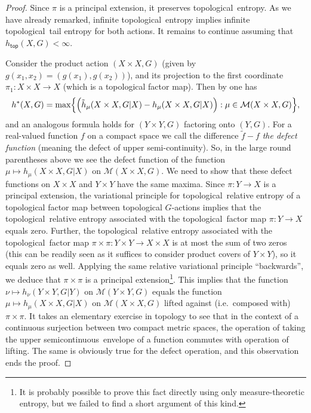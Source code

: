 \documentclass[12pt]{amsart}
\theoremstyle{definition}
\numberwithin{equation}{section}
\def \M {\mathcal M}
\def \htop {h_{\mathsf{top}}}
\def \tl {topological}
\def \htop{h_{\mathsf{top}}}
\def \usc {upper semicontinuous}
\def \M {\mathcal M}
\def \htop {h_{\mathsf{top}}}
\def \tl {topological}
\def \htop{h_{\mathsf{top}}}
\def \usc {upper semicontinuous}
\begin{document}
\begin{proof}
Since $\pi$ is a principal extension, it preserves \tl\ entropy. As we have already remarked,
infinite \tl\ entropy implies infinite \tl\ tail entropy for both actions. It remains to continue assuming that $\htop(X,G)<\infty$. 

Consider the product action $(X\times X, G)$ (given by $g(x_1,x_2)=(g(x_1),g(x_2))$), and its projection to the first coordinate $\pi_1: X\times X\rightarrow X$ (which is a topological factor map). Then by \cite[Theorem 3.1]{ZhouZhangChen} one has
\begin{equation} \label{tce-X}
h^*(X, G)= \max\Bigl\{\Bigr(\tilde h_\mu(X\times X,G|X)-h_\mu(X\times X,G|X)\Bigr): \mu\in\M(X\times X,G)\Bigr\},
\end{equation}
and an analogous formula holds for $(Y\times Y,G)$ factoring onto $(Y,G)$. For a real-valued function $f$ on a compact space we call the difference $\tilde f - f$ \emph{the defect function} (meaning the defect of upper semi-continuity). So, in the large round parentheses above we see the defect function of the function $\mu\mapsto h_\mu(X\times X,G|X)$ on $\M(X\times X,G)$. We need to show that these defect functions on $X\times X$ and $Y\times Y$ have the same maxima. Since $\pi:Y\to X$ is a principal extension, the variational principle for \tl\ relative entropy of a topological factor map between topological $G$-actions implies that the \tl\ relative entropy associated with the \tl\ factor map $\pi:Y\to X$ equals zero. Further, the \tl\ relative entropy associated with the \tl\ factor map $\pi\times\pi:Y\times Y\to X\times X$ is at most the sum of two zeros (this can be readily seen as it suffices to consider product covers of $Y\times Y$), so it equals zero as well. Applying the same relative variational principle ``backwards'', we deduce that $\pi\times\pi$ is a principal extension\footnote{It is probably possible to prove this fact directly using only measure-theoretic entropy, but we failed to find a short argument of this kind.}. This implies that the function $\nu\mapsto h_\nu(Y\times Y,G|Y)$ on $\M(Y\times Y,G)$ equals the function $\mu\mapsto h_\mu(X\times X,G|X)$ on $\M(X\times X,G)$ lifted against (i.e.\ composed with) $\pi\times\pi$. It takes an elementary exercise in topology to see that in the context of a continuous surjection between two compact metric spaces, the operation of taking the \usc\ envelope of a function commutes with operation of lifting. The same is obviously true for the defect operation, and this observation ends the proof.
\end{proof}	
	
\end{document}
